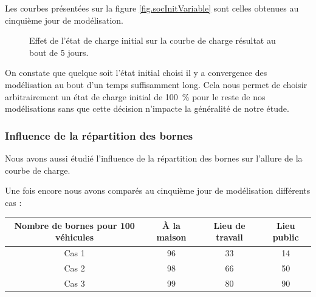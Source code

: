 				Les courbes présentées sur la figure \vref{fig.socInitVariable} sont celles obtenues au cinquième jour de modélisation.
				
				\begin{figure}[!h]
					\centering
					\caption{Effet de l'état de charge initial sur la courbe de charge résultat au bout de 5 jours. \label{fig.socInitVariable}}
				\end{figure}			
				
				On constate que quelque soit l'état initial choisi il y a convergence des modélisation au bout d'un temps suffisamment long. Cela nous permet de choisir arbitrairement un état de charge initial de \SI{100}{\percent} pour le reste de nos modélisations sans que cette décision n'impacte la généralité de notre étude. 
		
				
				\subsubsection{Influence de la répartition des bornes}
				
				Nous avons aussi étudié l'influence de la répartition des bornes sur l'allure de la courbe de charge.
				
				Une fois encore nous avons comparés au cinquième jour de modélisation différents cas : 
				\begin{table}[h!]
				\centering
				\begin{tabular}{|c||c|c|c|}
					\hline
					Nombre de bornes pour 100 véhicules & À la maison & Lieu de travail & Lieu public \\
					\hline
					Cas 1 & 96 & 33 & 14 \\
					\hline
					Cas 2 & 98 & 66 & 50\\
					\hline
					Cas 3 & 99 & 80 & 90\\
					\hline
				\end{tabular}
				\end{table}		
				
